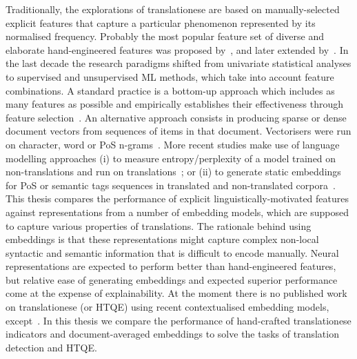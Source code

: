 Traditionally, the explorations of translationese are based on manually-selected explicit features that capture a particular phenomenon represented by its normalised frequency. Probably the most popular feature set of diverse and elaborate hand-engineered features was proposed by~\citet{Volansky2012}, and later extended by~\citet{Sominsky2019}.
In the last decade the research paradigms shifted from univariate statistical analyses to supervised and unsupervised \gls*{ML} methods, which take into account feature combinations. A standard practice is a bottom-up approach which includes as many features as possible and empirically establishes their effectiveness through feature selection~\cite{Evert2017, Yuan2018}. 
An alternative approach consists in producing sparse or dense document vectors from sequences of items in that document. Vectorisers were run on character, word or \gls{PoS} n-grams~\cite[, respectively][]{Popescu2011,Baroni2005,Carter2012,Eetemadi2015,Rabinovich2017,Lapshinova2019}. %
More recent studies make use of language modelling approaches (i) to measure entropy/perplexity of a model trained on non-translations and run on translations~\citep{Karakanta2019,Nikolaev2020}; or (ii) to generate static embeddings for \gls*{PoS} or semantic tags sequences in translated and non-translated corpora~\citep{Chowdhury2020,Chowdhury2021}. 
This thesis compares the performance of explicit linguistically-motivated features against representations from a number of embedding models, which are supposed to capture various properties of translations. 
The rationale behind using embeddings is that these representations might capture complex non-local syntactic and semantic information that is difficult to encode manually. Neural representations are expected to perform better than hand-engineered features, but relative ease of generating embeddings and expected superior performance come at the expense of explainability. 
At the moment there is no published work on translationese (or HTQE) using recent contextualised embedding models, except~\citet{Pylypenko2021}. In this thesis we compare the performance of hand-crafted translationese indicators and document-averaged embeddings to solve the tasks of translation detection and HTQE. 


